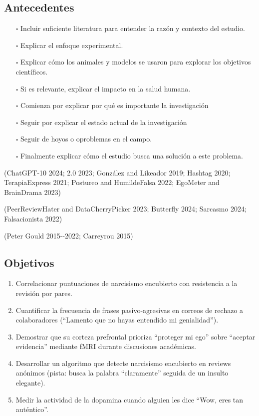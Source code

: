 \documentclass[
]{article}
\providecommand{\tightlist}{%
  \setlength{\itemsep}{0pt}\setlength{\parskip}{0pt}}\usepackage{longtable,booktabs,array}
\begin{document}
\subsection{Antecedentes}\label{antecedentes}

\begin{itemize}
\tightlist
\item[$\square$]
  Incluir suficiente literatura para entender la razón y contexto del
  estudio.
\item[$\square$]
  Explicar el enfoque experimental.
\item[$\square$]
  Explicar cómo los animales y modelos se usaron para explorar los
  objetivos científicos.
\item[$\square$]
  Si es relevante, explicar el impacto en la salud humana.
\item[$\square$]
  Comienza por explicar por qué es importante la investigación
\item[$\square$]
  Seguir por explicar el estado actual de la investigación
\item[$\square$]
  Seguir de hoyos o oproblemas en el campo.
\item[$\square$]
  Finalmente explicar cómo el estudio busca una solución a este
  problema.
\end{itemize}

(ChatGPT-10 2024; 2.0 2023; González and Likeador 2019; Hashtag 2020;
TerapiaExpress 2021; Postureo and HumildeFalsa 2022; EgoMeter and
BrainDrama 2023)

(PeerReviewHater and DataCherryPicker 2023; Butterfly 2024; Sarcasmo
2024; Falsacionista 2022)

(Peter Gould 2015-\/-2022; Carreyrou 2015)

\subsection{Objetivos}\label{objetivos}

\begin{enumerate}
\def\labelenumi{\roman{enumi}.}
\item
  Correlacionar puntuaciones de narcisismo encubierto con resistencia a
  la revisión por pares.
\item
  Cuantificar la frecuencia de frases pasivo-agresivas en correos de
  rechazo a colaboradores (``Lamento que no hayas entendido mi
  genialidad'').
\item
  Demostrar que su corteza prefrontal prioriza ``proteger mi ego'' sobre
  ``aceptar evidencia'' mediante fMRI durante discusiones académicas.
\item
  Desarrollar un algoritmo que detecte narcisismo encubierto en reviews
  anónimos (pista: busca la palabra ``claramente'' seguida de un insulto
  elegante).
\item
  Medir la actividad de la dopamina cuando alguien les dice ``Wow, eres
  tan auténtico''.
\end{enumerate}
\end{document}
